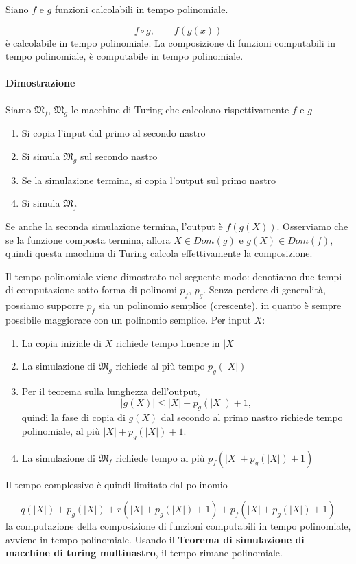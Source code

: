 Siano $f$ e $g$ funzioni calcolabili in tempo polinomiale.

$$
f \circ g, \qquad f(g(x))
$$
%
è calcolabile in tempo polinomiale.
La composizione di funzioni computabili in tempo polinomiale, è computabile in tempo polinomiale.

\paragraph{Dimostrazione}
Siamo $\mathfrak{M}_f, \, \mathfrak{M}_g$ le macchine di Turing che calcolano rispettivamente $f$ e $g$
\begin{enumerate}
	\item Si copia l'input dal primo al secondo nastro
	\item Si simula $\mathfrak{M}_g$ sul secondo nastro
	\item Se la simulazione termina, si copia l'output sul primo nastro
	\item Si simula $\mathfrak{M}_f$
\end{enumerate}
%
Se anche la seconda simulazione termina, l'output è $f(g(X))$. Osserviamo che se la funzione composta termina, allora $X \in Dom(g)$ e $g(X) \in Dom(f)$, quindi questa macchina di Turing calcola effettivamente la composizione. 

Il tempo polinomiale viene dimostrato nel seguente modo: denotiamo due tempi di computazione sotto forma di polinomi $p_f, \, p_g$. Senza perdere di generalità, possiamo supporre $p_f$ sia un polinomio semplice (crescente), in quanto è sempre possibile maggiorare con un polinomio semplice. Per input $X$:
\begin{enumerate}
	\item La copia iniziale di $X$ richiede tempo lineare in $|X|$
	\item La simulazione di $\mathfrak{M}_g$ richiede al più tempo $p_g(|X|)$
	\item Per il teorema sulla lunghezza dell'output, 
	$$
	|g(X)| \leq |X| + p_g(|X|) + 1,
	$$
	quindi la fase di copia di $g(X)$ dal secondo al primo nastro richiede tempo polinomiale, al più $|X| + p_g(|X|) + 1$. 
	\item La simulazione di $\mathfrak{M}_f$ richiede tempo al più $p_f(|X| + p_g(|X|) + 1)$
\end{enumerate}
%
Il tempo complessivo è quindi limitato dal polinomio

$$
q(|X|) + p_g(|X|) +r(|X| + p_g(|X|) + 1) + p_f(|X| + p_g(|X|) + 1)
$$
%
la computazione della composizione di funzioni computabili in tempo polinomiale, avviene in tempo polinomiale.
Usando il \textbf{Teorema di simulazione di macchine di turing multinastro}, il tempo rimane polinomiale.



